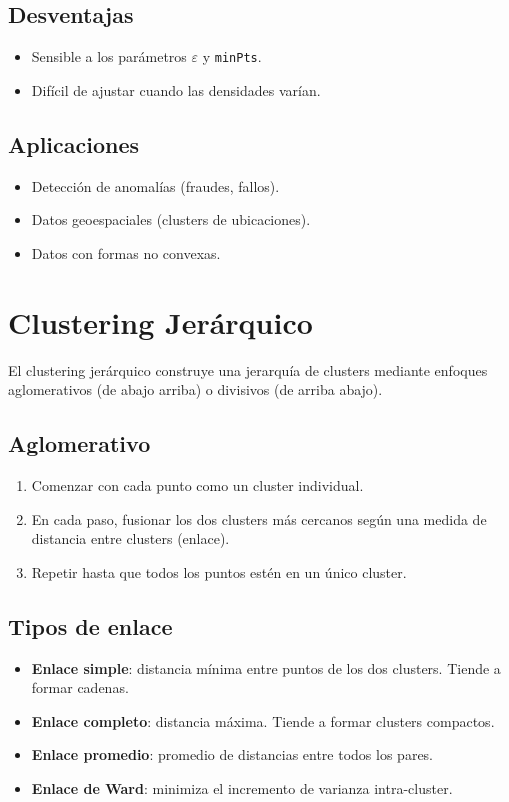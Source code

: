 \documentclass[12pt,a4paper,openany,oneside]{book}
\begin{document}
\subsection{Desventajas}
\begin{itemize}
    \item Sensible a los parámetros \(\varepsilon\) y \texttt{minPts}.
    \item Difícil de ajustar cuando las densidades varían.
\end{itemize}

\subsection{Aplicaciones}
\begin{itemize}
    \item Detección de anomalías (fraudes, fallos).
    \item Datos geoespaciales (clusters de ubicaciones).
    \item Datos con formas no convexas.
\end{itemize}

\section{Clustering Jerárquico}

El clustering jerárquico construye una jerarquía de clusters mediante enfoques aglomerativos (de abajo arriba) o divisivos (de arriba abajo).

\subsection{Aglomerativo}
\begin{enumerate}
    \item Comenzar con cada punto como un cluster individual.
    \item En cada paso, fusionar los dos clusters más cercanos según una medida de distancia entre clusters (enlace).
    \item Repetir hasta que todos los puntos estén en un único cluster.
\end{enumerate}

\subsection{Tipos de enlace}
\begin{itemize}
    \item \textbf{Enlace simple}: distancia mínima entre puntos de los dos clusters. Tiende a formar cadenas.
    \item \textbf{Enlace completo}: distancia máxima. Tiende a formar clusters compactos.
    \item \textbf{Enlace promedio}: promedio de distancias entre todos los pares.
    \item \textbf{Enlace de Ward}: minimiza el incremento de varianza intra-cluster.
\end{itemize}
\end{document}
